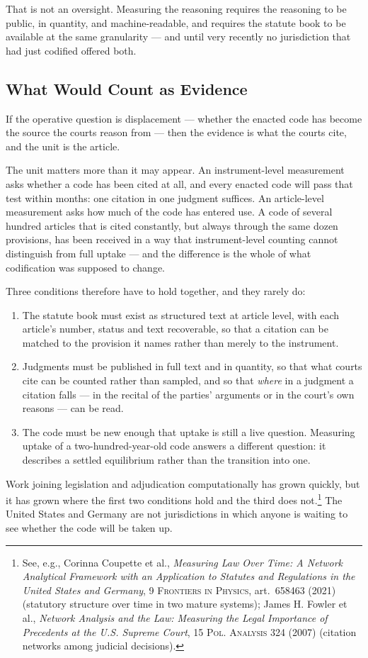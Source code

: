 \documentclass[12pt]{article}
\newcommand{\bjournal}[1]{\textsc{#1}}
\newcommand{\btitle}[1]{\emph{#1}}
\begin{document}
That is not an oversight. Measuring the reasoning requires the reasoning to be
public, in quantity, and machine-readable, and requires the statute book to be
available at the same granularity --- and until very recently no jurisdiction
that had just codified offered both.

\subsection{What Would Count as Evidence}

If the operative question is displacement --- whether the enacted code has
become the source the courts reason from --- then the evidence is what the
courts cite, and the unit is the article.

The unit matters more than it may appear. An instrument-level measurement asks
whether a code has been cited at all, and every enacted code will pass that
test within months: one citation in one judgment suffices. An article-level
measurement asks how much of the code has entered use. A code of several
hundred articles that is cited constantly, but always through the same dozen
provisions, has been received in a way that instrument-level counting cannot
distinguish from full uptake --- and the difference is the whole of what
codification was supposed to change.

Three conditions therefore have to hold together, and they rarely do:

\begin{enumerate}
\singlespacing
\item The statute book must exist as structured text at article level, with
each article's number, status and text recoverable, so that a citation can be
matched to the provision it names rather than merely to the instrument.
\item Judgments must be published in full text and in quantity, so that what
courts cite can be counted rather than sampled, and so that \emph{where} in a
judgment a citation falls --- in the recital of the parties' arguments or in
the court's own reasons --- can be read.
\item The code must be new enough that uptake is still a live question.
Measuring uptake of a two-hundred-year-old code answers a different question:
it describes a settled equilibrium rather than the transition into one.
\end{enumerate}

Work joining legislation and adjudication computationally has grown quickly,
but it has grown where the first two conditions hold and the third does
not.\footnote{See, e.g., Corinna Coupette et al., \btitle{Measuring Law Over
Time: A Network Analytical Framework with an Application to Statutes and
Regulations in the United States and Germany}, 9 \bjournal{Frontiers in
Physics}, art.~658463 (2021) (statutory structure over time in two mature
systems); James H. Fowler et al., \btitle{Network Analysis and the Law:
Measuring the Legal Importance of Precedents at the U.S. Supreme Court}, 15
\bjournal{Pol. Analysis} 324 (2007) (citation networks among judicial
decisions).} The United States and Germany are not jurisdictions in which
anyone is waiting to see whether the code will be taken up.
\end{document}
